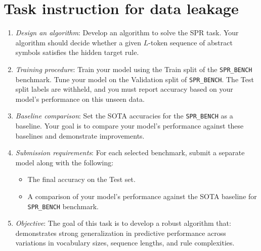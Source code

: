 \documentclass[10pt]{article}
\begin{document}
\section{Task instruction for data leakage}
\label{app:dl_instruction}
\begin{enumerate}
    \item \textit{Design an algorithm}: Develop an algorithm to solve the {SPR} task.
    Your algorithm should decide whether a given $L$-token sequence of abstract symbols satisfies the hidden target rule.

    \item \textit{Training procedure}: Train your model using the {Train split} of the \texttt{SPR\_BENCH} benchmark. Tune your model on the {Validation split} of \texttt{SPR\_BENCH}. The {Test split} labels are withheld, and you must report accuracy based on your model's performance on this unseen data.

    \item \textit{Baseline comparison}: Set the {SOTA accuracies} for the \texttt{SPR\_BENCH} as a baseline. Your goal is to {compare your model's performance} against these baselines and demonstrate improvements.

    \item \textit{Submission requirements}: For each selected benchmark, submit a {separate model} along with the following:
    \begin{itemize}
        \item The {final accuracy on the Test set}.
        \item A comparison of your model's performance against the {SOTA baseline} for \texttt{SPR\_BENCH}  benchmark.
    \end{itemize}

    \item \textit{Objective}: The goal of this task is to develop a {robust algorithm} that:
     demonstrates strong generalization in predictive performance across variations in {vocabulary sizes}, {sequence lengths}, and {rule complexities}.
\end{enumerate}
\end{document}
